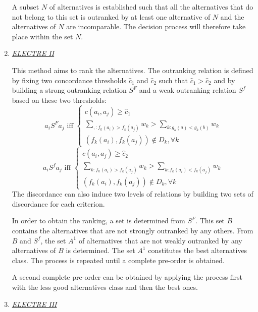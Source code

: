 \begin{enumerate}
A subset $N$ of alternatives is established such that all the alternatives that do not belong to this set is outranked by at least one alternative of $N$ and the alternatives of $N$ are incomparable. The decision process will therefore take place within the set $N$.

\item \textit{\underline{ELECTRE II}}

This method aims to rank the alternatives. The outranking relation is defined by fixing two concordance thresholds $\hat{c}_{1}$ and $\hat{c}_{2}$ such that $\hat{c}_{1} > \hat{c}_{2}$ and by building a strong outranking relation $S^{F}$ and a weak outranking relation $S^{f}$ based on these two thresholds:
\begin{equation}
a_iS^{F}a_j \text{ iff } \begin{cases}
	c(a_i, a_j) \geq \hat{c}_{1}\\
	\sum_{, : f_{k}(a_i)>f_{k}(a_j)} w_{k} > \sum_{k : g_{k}(a)<g_{k}(b)} w_{k}\\
	(f_{k}(a_i), f_{k}(a_j)) \not\in D_{k}, \forall k
	\end{cases}
\end{equation}
\begin{equation}
a_iS^{f}a_j \text{ iff } \begin{cases}
	c(a_i, a_j) \geq \hat{c}_{2}\\
	\sum_{k : f_{k}(a_i)>f_{k}(a_j)} w_{k} > \sum_{k : f_{k}(a_i)<f_{k}(a_j)} w_{k}\\
	(f_{k}(a_i), f_{k}(a_j)) \not\in D_k, \forall k
	\end{cases}
\end{equation}
The discordance can also induce two levels of relations by building two sets of discordance for each criterion.

In order to obtain the ranking, a set is determined from $S^ {F}$. This set $B$ contains the alternatives that are not strongly outranked by any others. From $B$ and $S^{f}$, the set $A^{1}$ of alternatives that are not weakly outranked by any alternatives of $B$ is determined. The set $A^{1}$ constitutes the best alternatives class. The process is repeated until a complete pre-order is obtained.

A second complete pre-order can be obtained by applying the process first with the less good alternatives class and then the best ones.

\item \textit{\underline{ELECTRE III}}


\end{enumerate}
